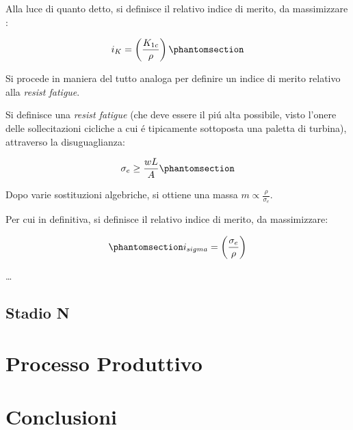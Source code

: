 \documentclass{article}
\begin{document}
        Alla luce di quanto detto, si definisce il relativo indice di merito, da massimizzare \autocite{SciencePubGroup}:

        \begin{equation}
            i_{K} = \left (\frac{K_{1c}}{\rho}\right)
            \phantomsection \label{equation:index_frac_tough}
        \end{equation}
        \clearpage 

        Si procede in maniera del tutto analoga per definire un indice di merito relativo alla 
        \textit{resist fatigue}.

        Si definisce una \textit{resist fatigue} (che deve essere il piú alta possibile,
        visto l'onere delle sollecitazioni cicliche a cui é tipicamente sottoposta una paletta di turbina), 
        attraverso la disuguaglianza:

        \begin{equation}
            \sigma_e \geq \frac{wL}{A}
            \phantomsection \label{equation:resist_fatigue}
        \end{equation}

        Dopo varie sostituzioni algebriche, si ottiene una massa $m \propto \frac{\rho}{\sigma_e}$.

        Per cui in definitiva, si definisce il relativo indice di merito, da massimizzare:

        \begin{equation}
            \phantomsection \label{equation:resist_fatigue_index}
            i_{sigma} = \left (\frac{\sigma_e}{\rho}\right)
        \end{equation}

        \clearpage 
        \dots
        \subsection{Stadio N}
        \clearpage

    \section{Processo Produttivo\label{product_process}}

    \clearpage

    \section{Conclusioni\label{conclusioni}}

    \clearpage

    \printbibliography
    
\end{document}
